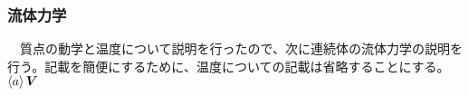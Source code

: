 \subsubsection{流体力学}
　質点の動学と温度について説明を行ったので、次に連続体の流体力学の説明を行う。記載を簡便にするために、温度についての記載は省略することにする。$\braket{a}{}\bm{V}$